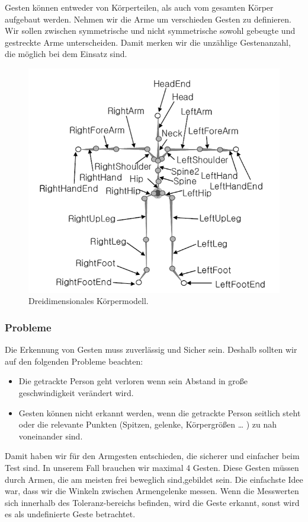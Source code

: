 Gesten können entweder  von Körperteilen, als auch vom gesamten Körper aufgebaut werden.
Nehmen wir die Arme um verschieden Gesten zu definieren. Wir sollen  zwischen symmetrische  und nicht symmetrische sowohl gebeugte und gestreckte Arme unterscheiden.
Damit merken wir die unzählige Gestenanzahl, die möglich bei dem Einsatz sind.
\begin{figure}[h]
	\centering
	\includegraphics[scale=0.7]{graphics/BILD-Skelett.png}
	\caption{Dreidimensionales Körpermodell\cite{Hwang2006}.}
	\label{fig:gesten_skelett}
\end{figure}

\subsubsection{Probleme}
\authorsection{\editorhamza}

Die Erkennung von Gesten muss zuverlässig und Sicher sein. Deshalb sollten wir auf den folgenden Probleme beachten:
\begin{itemize}
\item Die getrackte Person geht verloren wenn sein Abstand in große geschwindigkeit  verändert wird.
\item Gesten können nicht erkannt werden, wenn die getrackte Person seitlich steht oder die relevante Punkten (Spitzen, gelenke, Körpergrößen … ) zu nah voneinander sind.
\end{itemize}
Damit haben  wir für den  Armgesten  entschieden, die sicherer und einfacher beim Test sind.
In unserem Fall brauchen wir maximal 4 Gesten.
Diese Gesten müssen durch Armen, die am meisten frei beweglich sind,gebildet sein.
Die einfachste Idee war, dass wir die Winkeln  zwischen Armengelenke messen. Wenn die Messwerten sich  innerhalb des Toleranz-bereichs befinden, wird die Geste erkannt, sonst  wird es als undefinierte Geste betrachtet.

